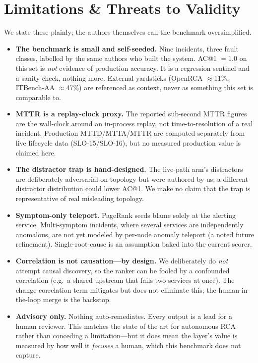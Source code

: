 \documentclass[11pt]{article}
\begin{document}
\section{Limitations \& Threats to Validity}
\label{sec:limitations}

We state these plainly; the authors themselves call the benchmark oversimplified.

\begin{itemize}
  \item \textbf{The benchmark is small and self-seeded.} Nine incidents, three
    fault classes, labelled by the same authors who built the system. AC@1 $= 1.0$
    on this set is \emph{not} evidence of production accuracy. It is a regression
    sentinel and a sanity check, nothing more. External yardsticks (OpenRCA
    $\approx$11\%, ITBench-AA $\approx$47\%) are referenced as context, never as
    something this set is comparable to.
  \item \textbf{MTTR is a replay-clock proxy.} The reported sub-second MTTR figures
    are the wall-clock around an in-process replay, not time-to-resolution of a
    real incident. Production MTTD/MTTA/MTTR are computed separately from live
    lifecycle data (SLO-15/SLO-16), but no measured production value is claimed
    here.
  \item \textbf{The distractor trap is hand-designed.} The live-path arm's
    distractors are deliberately adversarial on topology but were authored by us; a
    different distractor distribution could lower AC@1. We make no claim that the
    trap is representative of real misleading topology.
  \item \textbf{Symptom-only teleport.} PageRank seeds blame solely at the alerting
    service. Multi-symptom incidents, where several services are independently
    anomalous, are not yet modeled by per-node anomaly teleport (a noted future
    refinement). Single-root-cause is an assumption baked into the current scorer.
  \item \textbf{Correlation is not causation---by design.} We deliberately do
    \emph{not} attempt causal discovery, so the ranker can be fooled by a
    confounded correlation (e.g.\ a shared upstream that fails two services at
    once). The change-correlation term mitigates but does not eliminate this; the
    human-in-the-loop merge is the backstop.
  \item \textbf{Advisory only.} Nothing auto-remediates. Every output is a lead for
    a human reviewer. This matches the state of the art for autonomous RCA rather
    than conceding a limitation---but it does mean the layer's value is measured by
    how well it \emph{focuses} a human, which this benchmark does not capture.
\end{itemize}
\end{document}
